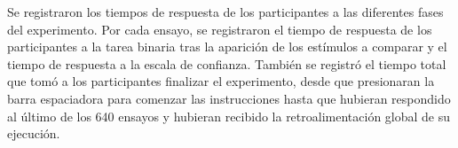 Se registraron los tiempos de respuesta de los participantes a las diferentes fases del experimento. Por cada ensayo, se registraron el tiempo de respuesta de los participantes a la tarea binaria tras la aparición de los estímulos a comparar y el tiempo de respuesta a la escala de confianza. También se registró el tiempo total que tomó a los participantes finalizar el experimento, desde que presionaran la barra espaciadora para comenzar las instrucciones hasta que hubieran respondido al último de los 640 ensayos y hubieran recibido la retroalimentación global de su ejecución.\\


